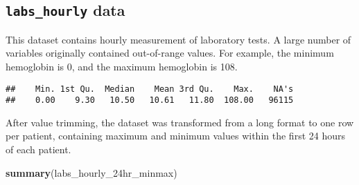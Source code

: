 \documentclass[
]{article}
\newenvironment{Shaded}{\begin{snugshade}}{\end{snugshade}}
\newcommand{\FunctionTok}[1]{\textcolor[rgb]{0.13,0.29,0.53}{\textbf{#1}}}
\newcommand{\NormalTok}[1]{#1}
\newcommand{\SpecialCharTok}[1]{\textcolor[rgb]{0.81,0.36,0.00}{\textbf{#1}}}
\begin{document}
\hypertarget{labs_hourly-data}{%
\subsection{\texorpdfstring{\texttt{labs\_hourly}
data}{labs\_hourly data}}\label{labs_hourly-data}}

This dataset contains hourly measurement of laboratory tests. A large
number of variables originally contained out-of-range values. For
example, the minimum hemoglobin is 0, and the maximum hemoglobin is 108.

\begin{Shaded}
\end{Shaded}

\begin{verbatim}
##    Min. 1st Qu.  Median    Mean 3rd Qu.    Max.    NA's 
##    0.00    9.30   10.50   10.61   11.80  108.00   96115
\end{verbatim}

After value trimming, the dataset was transformed from a long format to
one row per patient, containing maximum and minimum values within the
first 24 hours of each patient.

\begin{Shaded}
\begin{Highlighting}[]
\FunctionTok{summary}\NormalTok{(labs\_hourly\_24hr\_minmax)}
\end{Highlighting}
\end{Shaded}
\end{document}
